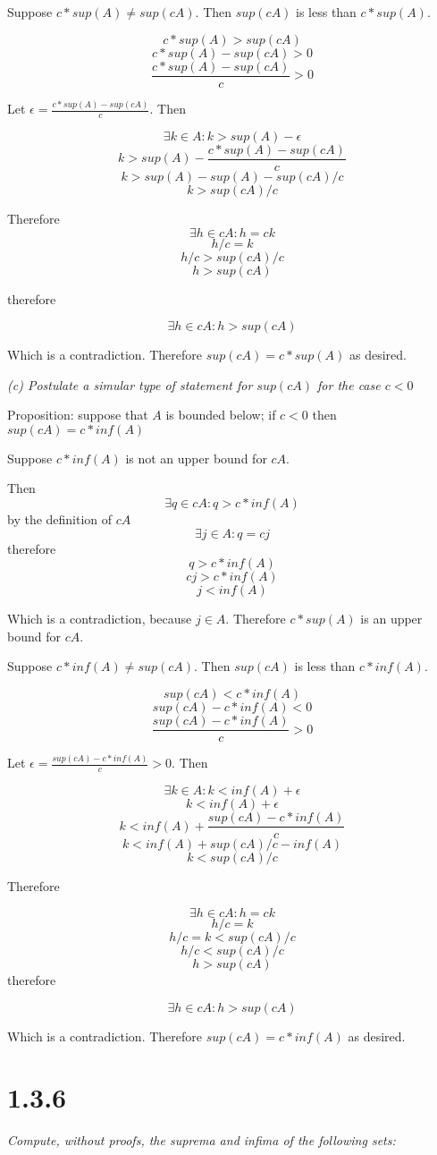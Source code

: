 \documentclass[11pt,oneside,titlepage]{book}
\begin{document}
Suppose $c *sup(A) \neq sup(cA)$. Then $sup(c A)$ is less
than $c * sup(A)$.

$$c * sup(A) > sup(cA)$$
$$c * sup(A) - sup(cA) > 0$$
$$\frac{c * sup(A) - sup(cA)}{c} > 0$$

Let $\epsilon = \frac{c * sup(A) - sup(cA)}{c}$. Then


$$\exists k \in A: k > sup(A) - \epsilon$$
$$k > sup(A) - \frac{c * sup(A) - sup(cA)}{c}$$
$$k > sup(A) - sup(A) - sup(cA)/c$$
$$k > sup(cA)/c$$

Therefore
$$\exists h \in cA: h = ck$$
$$h/c = k$$
$$h/c>  sup(cA)/c$$
$$h > sup(cA)$$

therefore

$$\exists h \in cA: h > sup(cA)$$

Which is a contradiction. Therefore $sup(cA) = c * sup(A)$ as desired.

\textit{(c) Postulate a simular type of statement for $sup(cA)$ for the case
  $c < 0$}

Proposition: suppose that $A$ is bounded below;  if $c < 0$ then $sup(cA) = c
* inf(A)$

Suppose $c * inf(A)$ is not an upper bound for $cA$.

Then
$$\exists q \in cA: q > c * inf(A)$$
by the definition of $cA$
$$\exists j \in A: q = cj$$
therefore
$$q > c * inf(A)$$
$$cj > c * inf(A)$$
$$j < inf(A)$$

Which is a contradiction, because $j \in A$. Therefore $c * sup(A)$ is an
upper bound for $cA$.

Suppose $c * inf(A) \neq sup(cA)$. Then $sup(c A)$ is less
than $c * inf(A)$.

$$sup(cA) < c * inf(A)$$
$$sup(cA) - c * inf(A) < 0$$
$$\frac{sup(cA) - c * inf(A)}{c} > 0$$

Let $\epsilon = \frac{sup(cA) - c * inf(A)}{c} > 0$. Then

$$\exists k \in A: k < inf(A) + \epsilon$$
$$ k < inf(A) + \epsilon$$
$$ k < inf(A) + \frac{sup(cA) - c * inf(A)}{c}$$
$$ k < inf(A) + sup(cA)/c - inf(A)$$
$$ k < sup(cA)/c$$

Therefore

$$\exists h \in cA: h = ck$$
$$h/c = k$$
$$h/c = k < sup(cA) / c$$
$$h/c < sup(cA) / c$$
$$h > sup(cA)$$
therefore

$$\exists h \in cA: h > sup(cA)$$

Which is a contradiction. Therefore $sup(cA) = c * inf(A)$ as desired.

\section*{1.3.6}
\textit{Compute, without proofs, the suprema and infima of the following
  sets:}
\end{document}
